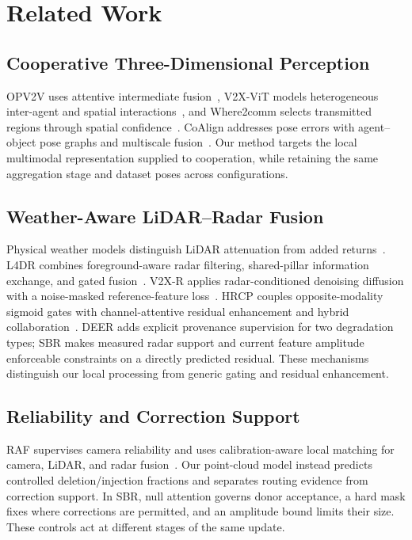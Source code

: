 \documentclass[conference]{IEEEtran}
\begin{document}
\section{Related Work}
\subsection{Cooperative Three-Dimensional Perception}
OPV2V uses attentive intermediate fusion~\cite{opv2v}, V2X-ViT models heterogeneous inter-agent and spatial interactions~\cite{v2xvit}, and Where2comm selects transmitted regions through spatial confidence~\cite{where2comm}. CoAlign addresses pose errors with agent--object pose graphs and multiscale fusion~\cite{coalign}. Our method targets the local multimodal representation supplied to cooperation, while retaining the same aggregation stage and dataset poses across configurations.

\subsection{Weather-Aware LiDAR--Radar Fusion}
Physical weather models distinguish LiDAR attenuation from added returns~\cite{fog,snow}. L4DR combines foreground-aware radar filtering, shared-pillar information exchange, and gated fusion~\cite{l4dr}. V2X-R applies radar-conditioned denoising diffusion with a noise-masked reference-feature loss~\cite{v2xr}. HRCP couples opposite-modality sigmoid gates with channel-attentive residual enhancement and hybrid collaboration~\cite{hrcp}. DEER adds explicit provenance supervision for two degradation types; SBR makes measured radar support and current feature amplitude enforceable constraints on a directly predicted residual. These mechanisms distinguish our local processing from generic gating and residual enhancement.

\subsection{Reliability and Correction Support}
RAF supervises camera reliability and uses calibration-aware local matching for camera, LiDAR, and radar fusion~\cite{raf}. Our point-cloud model instead predicts controlled deletion/injection fractions and separates routing evidence from correction support. In SBR, null attention governs donor acceptance, a hard mask fixes where corrections are permitted, and an amplitude bound limits their size. These controls act at different stages of the same update.
\end{document}
